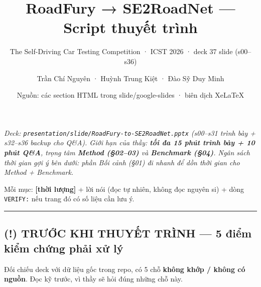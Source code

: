 \documentclass[
  11pt,
]{article}
\title{RoadFury → SE2RoadNet --- Script thuyết trình}
\subtitle{The Self-Driving Car Testing Competition · ICST 2026 · deck 37
slide (s00--s36)}
\author{Trần Chí Nguyên · Huỳnh Trung Kiệt · Đào Sỹ Duy Minh}
\date{Nguồn: các section HTML trong slide/google-slides · biên dịch
XeLaTeX}
\renewenvironment{quote}
  {\par\smallskip\noindent
   \def\FrameCommand{{\color{deckorange}\vrule width 2.5pt}\hspace{10pt}}%
   \MakeFramed{\advance\hsize-\width\FrameRestore}%
   \footnotesize\itshape\color{deckslate}}
  {\par\endMakeFramed\smallskip}
\begin{document}
\maketitle

{
\setcounter{tocdepth}{1}
\tableofcontents
}
\begin{quote}
Deck: \texttt{presentation/slide/RoadFury-to-SE2RoadNet.pptx} (s00--s31
trình bày + s32--s36 backup cho Q\&A). Giới hạn của thầy: \textbf{tối đa
15 phút trình bày + 10 phút Q\&A}, trọng tâm \textbf{Method (§02--03)}
và \textbf{Benchmark (§04)}. Ngân sách thời gian gợi ý bên dưới: phần
Bối cảnh (§01) đi nhanh để dồn thời gian cho Method + Benchmark.

Mỗi mục: \textbf{{[}thời lượng{]}} + lời nói (đọc tự nhiên, không đọc
nguyên si) + dòng \texttt{VERIFY:} nếu trang đó có số liệu cần lưu ý.
\end{quote}

\begin{center}\rule{0.5\linewidth}{0.5pt}\end{center}

\subsection{(!) TRƯỚC KHI THUYẾT TRÌNH --- 5 điểm kiểm chứng phải xử
lý}\label{trux1b0ux1edbc-khi-thuyux1ebft-truxecnh-5-ux111iux1ec3m-kiux1ec3m-chux1ee9ng-phux1ea3i-xux1eed-luxfd}

Đối chiếu deck với dữ liệu gốc trong repo, có 5 chỗ \textbf{không khớp /
không có nguồn}. Đọc kỹ trước, vì thầy sẽ hỏi đúng những chỗ này.
\end{document}
